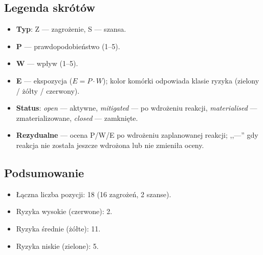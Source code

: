 \documentclass[11pt,a4paper]{article}
\begin{document}
	\subsection*{Legenda skrótów}
	\begin{itemize}[noitemsep]
		\item \textbf{Typ}: Z --- zagrożenie, S --- szansa.
		\item \textbf{P} --- prawdopodobieństwo (1--5).
		\item \textbf{W} --- wpływ (1--5).
		\item \textbf{E} --- ekspozycja ($E = P \cdot W$); kolor komórki odpowiada klasie ryzyka (zielony / żółty / czerwony).
		\item \textbf{Status}: \textit{open} --- aktywne, \textit{mitigated} --- po wdrożeniu reakcji, \textit{materialised} --- zmaterializowane, \textit{closed} --- zamknięte.
		\item \textbf{Rezydualne} --- ocena P/W/E po wdrożeniu zaplanowanej reakcji; ,,---'' gdy reakcja nie została jeszcze wdrożona lub nie zmieniła oceny.
	\end{itemize}
	
	\subsection*{Podsumowanie}
	\begin{itemize}[noitemsep]
		\item Łączna liczba pozycji: 18 (16 zagrożeń, 2 szanse).
		\item Ryzyka wysokie (czerwone): 2.
		\item Ryzyka średnie (żółte): 11.
		\item Ryzyka niskie (zielone): 5.
	\end{itemize}
	
	\clearpage
	
\end{document}
